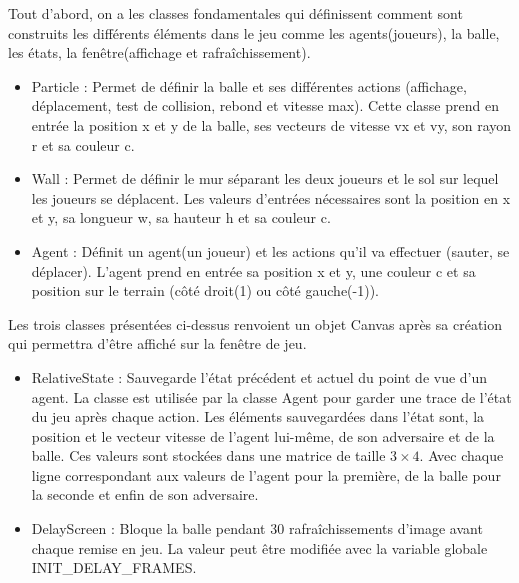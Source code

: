 \documentclass[11pt, a4paper]{article}
\begin{document}
Tout d'abord, on a les classes fondamentales qui définissent comment sont construits les différents éléments dans le jeu comme les agents(joueurs), la balle, les états, la fenêtre(affichage et rafraîchissement). \\

\begin{itemize}
\item Particle : Permet de définir la balle et ses différentes actions (affichage, déplacement, test de collision, rebond et vitesse max). Cette classe prend en entrée la position x et y de la balle, ses vecteurs de vitesse vx et vy, son rayon r et sa couleur c.\\

 \item Wall : Permet de définir le mur séparant les deux joueurs et le sol sur lequel les joueurs se déplacent. Les valeurs d'entrées nécessaires sont la position en x et y, sa longueur w, sa hauteur h et sa couleur c.\\

 \item Agent : Définit un agent(un joueur) et les actions qu'il va effectuer (sauter, se déplacer). L'agent prend en entrée sa position x et y, une couleur c et sa position sur le terrain (côté droit(1) ou côté gauche(-1)).\\

\end{itemize}
Les trois classes présentées ci-dessus renvoient un objet Canvas après sa création qui permettra d'être affiché sur la fenêtre de jeu. \\
\begin{itemize}
 \item RelativeState : Sauvegarde l'état précédent et actuel du point de vue d'un agent. La classe est utilisée par la classe Agent pour garder une trace de l'état du jeu après chaque action. Les éléments sauvegardées dans l'état sont, la position et le vecteur vitesse de l'agent lui-même, de son adversaire et de la balle. Ces valeurs sont stockées dans une matrice de taille $3 \times 4$. Avec chaque ligne correspondant aux valeurs de l'agent pour la première, de la balle pour la seconde et enfin de son adversaire.

 \item DelayScreen : Bloque la balle pendant 30 rafraîchissements d'image avant chaque remise en jeu. La valeur peut être modifiée avec la variable globale INIT\_DELAY\_FRAMES.\\

\end{itemize}
\end{document}
